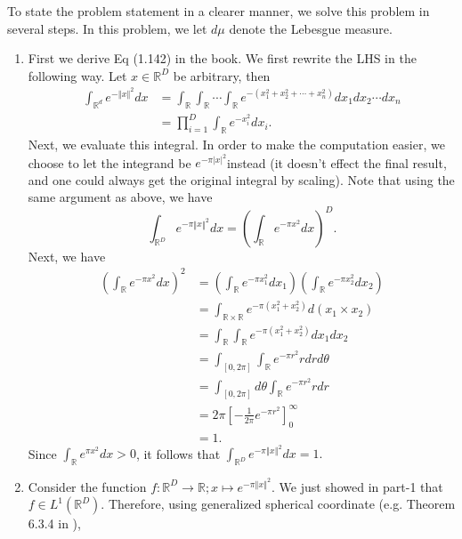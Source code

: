 To state the problem statement in a clearer manner, we solve this
problem in several steps. In this problem, we let $d\mu$ denote the
Lebesgue measure. 
\begin{enumerate}[leftmargin={*}]
\item First we derive Eq (1.142) in the book. We first rewrite the LHS
in the following way. Let $x\in\mathbb{R}^{D}$ be arbitrary, then
\begin{align*}
\int_{\mathbb{R}^{d}}e^{-\left\Vert x\right\Vert ^{2}}dx & =\int_{\mathbb{R}}\int_{\mathbb{R}}\cdots\int_{\mathbb{R}}e^{-(x_{1}^{2}+x_{2}^{2}+\cdots+x_{n}^{2})}dx_{1}dx_{2}\cdots dx_{n}\\
 & =\prod_{i=1}^{D}\int_{\mathbb{R}}e^{-x_{i}^{2}}dx_{i}.
\end{align*}
Next, we evaluate this integral. In order to make the computation
easier, we choose to let the integrand be $e^{-\pi\left|x\right|^{2}}$instead
(it doesn't effect the final result, and one could always get the
original integral by scaling). Note that using the same argument as
above, we have 
\[
\int_{\mathbb{R}^{D}}e^{-\pi\left\Vert x\right\Vert ^{2}}dx=\left(\int_{\mathbb{R}}e^{-\pi x^{2}}dx\right)^{D}.
\]
Next, we have 
\begin{align*}
\left(\int_{\mathbb{R}}e^{-\pi x^{2}}dx\right)^{2} & =\left(\int_{\mathbb{R}}e^{-\pi x_{1}^{2}}dx_{1}\right)\left(\int_{\mathbb{R}}e^{-\pi x_{2}^{2}}dx_{2}\right)\\
 & =\int_{\mathbb{R}\times\mathbb{R}}e^{-\pi(x_{1}^{2}+x_{2}^{2})}d(x_{1}\times x_{2})\tag{by Fubini's theorem}\\
 & =\int_{\mathbb{R}}\int_{\mathbb{R}}e^{-\pi(x_{1}^{2}+x_{2}^{2})}dx_{1}dx_{2}\tag{by Fubini's theorem}\\
 & =\int_{[0,2\pi]}\int_{\mathbb{R}}e^{-\pi r^{2}}rdrd\theta\tag{switch to polar coordinates}\\
 & =\int_{[0,2\pi]}d\theta\int_{\mathbb{R}}e^{-\pi r^{2}}rdr\\
 & =2\pi\left[-\frac{1}{2\pi}e^{-\pi r^{2}}\right]_{0}^{\infty}\\
 & =1.
\end{align*}
Since $\int_{\mathbb{R}}e^{\pi x^{2}}dx>0$, it follows that $\int_{\mathbb{R}^{D}}e^{-\pi\left\Vert x\right\Vert ^{2}}dx=1.$ 
\item Consider the function $f:\mathbb{R}^{D}\rightarrow\mathbb{R};x\mapsto e^{-\pi\left\Vert x\right\Vert ^{2}}.$
We just showed in part-1 that $f\in L^{1}(\mathbb{R}^{D}).$ Therefore,
using generalized spherical coordinate (e.g. Theorem 6.3.4 in \cite{stein2005real}),

\end{enumerate}
